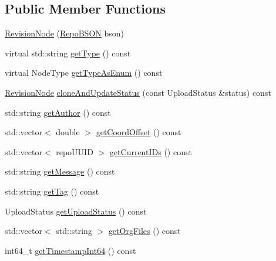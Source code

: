 \subsection*{Public Member Functions}
\begin{DoxyCompactItemize}
\item 
\hyperlink{classrepo_1_1core_1_1model_1_1_revision_node_ad92597d9731079e4d0bdf690f532e56e}{Revision\+Node} (\hyperlink{classrepo_1_1core_1_1model_1_1_repo_b_s_o_n}{Repo\+B\+S\+O\+N} bson)
\item 
virtual std\+::string \hyperlink{classrepo_1_1core_1_1model_1_1_revision_node_ac597aa317c2516be9f204e43ef896af4}{get\+Type} () const 
\item 
virtual Node\+Type \hyperlink{classrepo_1_1core_1_1model_1_1_revision_node_ae632d941e5a9bc2d8275c53bb1c41805}{get\+Type\+As\+Enum} () const 
\item 
\hyperlink{classrepo_1_1core_1_1model_1_1_revision_node}{Revision\+Node} \hyperlink{classrepo_1_1core_1_1model_1_1_revision_node_afabdf3d38019948f68e331610671583a}{clone\+And\+Update\+Status} (const Upload\+Status \&status) const 
\item 
std\+::string \hyperlink{classrepo_1_1core_1_1model_1_1_revision_node_af5a787130259c6744bcbf90eb7e23d65}{get\+Author} () const 
\item 
std\+::vector$<$ double $>$ \hyperlink{classrepo_1_1core_1_1model_1_1_revision_node_a5990bdfccf6db7f3fdf6167a51fd8f36}{get\+Coord\+Offset} () const 
\item 
std\+::vector$<$ repo\+U\+U\+I\+D $>$ \hyperlink{classrepo_1_1core_1_1model_1_1_revision_node_a90c58bc79e6a209907de191207b5e7fa}{get\+Current\+I\+Ds} () const 
\item 
std\+::string \hyperlink{classrepo_1_1core_1_1model_1_1_revision_node_a955d01925d470a40911b85b432a30c32}{get\+Message} () const 
\item 
std\+::string \hyperlink{classrepo_1_1core_1_1model_1_1_revision_node_aa8c67c1cb49adb80e0a746276cd560c8}{get\+Tag} () const 
\item 
Upload\+Status \hyperlink{classrepo_1_1core_1_1model_1_1_revision_node_ac0a4532dc10c44db48ed2e8a0ae29f30}{get\+Upload\+Status} () const 
\item 
std\+::vector$<$ std\+::string $>$ \hyperlink{classrepo_1_1core_1_1model_1_1_revision_node_a5c51b2bdfb7bbc1b291c4e6e84b46511}{get\+Org\+Files} () const 
\item 
int64\+\_\+t \hyperlink{classrepo_1_1core_1_1model_1_1_revision_node_ac7a14a78c8ab2372026b5f13e1f0e931}{get\+Timestamp\+Int64} () const 
\end{DoxyCompactItemize}
